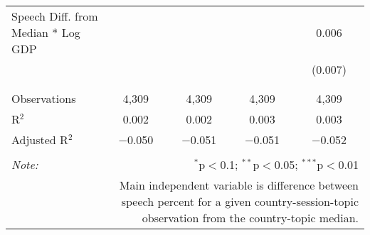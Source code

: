 \begin{table}[!htbp]
\begin{tabular}{@{\extracolsep{5pt}}lcccc}
 Speech Diff. from Median * Log GDP &  &  &  & 0.006 \\ 
  &  &  &  & (0.007) \\ 
  & & & & \\ 
\hline \\[-1.8ex] 
Observations & 4,309 & 4,309 & 4,309 & 4,309 \\ 
R$^{2}$ & 0.002 & 0.002 & 0.003 & 0.003 \\ 
Adjusted R$^{2}$ & $-$0.050 & $-$0.051 & $-$0.051 & $-$0.052 \\ 
\hline 
\hline \\[-1.8ex] 
\textit{Note:}  & \multicolumn{4}{r}{$^{*}$p$<$0.1; $^{**}$p$<$0.05; $^{***}$p$<$0.01} \\ 
 & \multicolumn{4}{r}{Main independent variable is difference between speech percent for a given country-session-topic observation from the country-topic median.} \\ 
\end{tabular} 
\end{table} 
